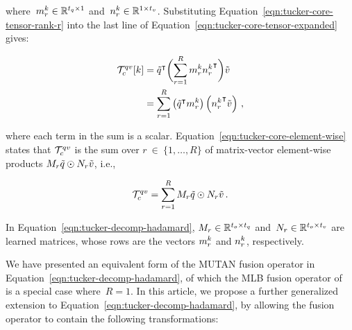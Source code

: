 \noindent where~$m_r^k \in \mathbb{R}^{t_q \times 1}$ and~$n_r^k \in \mathbb{R}^{1 \times t_v}$.
Substituting Equation~\ref{eqn:tucker-core-tensor-rank-r} into the last line of
Equation~\ref{eqn:tucker-core-tensor-expanded} gives:

\begin{align}
\begin{split}
        \mathcal{T}_c^{qv}[k] &= {\tilde{q}}^\intercal
                \biggl(\sum_{r = 1}^R m_r^k {n_r^k}^\intercal\biggr) \tilde{v}  \\
                     &= \sum_{r = 1}^R \left({\tilde{q}}^\intercal m_r^k\right)
                                \left({n_r^k}^\intercal \tilde{v}\right) \,,
\end{split}
\label{eqn:tucker-core-element-wise}
\end{align}

\noindent where each term in the sum is a scalar.
Equation~\ref{eqn:tucker-core-element-wise} states that $\mathcal{T}_c^{q{}v{}}$ is the sum
over $r~\in~\{1, \dots, R\}$ of matrix-vector element-wise products
$M_r \tilde{q} \odot N_r \tilde{v}$, i.e.,

\begin{equation}
        \mathcal{T}_c^{q{}v{}} =
                \sum_{r = 1}^R M_r \tilde{q} \odot N_r \tilde{v} \,.
\label{eqn:tucker-decomp-hadamard}
\end{equation}

\noindent In Equation~\ref{eqn:tucker-decomp-hadamard}, $M_r \in \mathbb{R}^{t_o \times t_q}$
and~$N_r \in \mathbb{R}^{t_o \times t_v}$ are learned matrices, whose rows are the
vectors $m_r^k$ and $n_r^k$, respectively.

We have presented an equivalent form of the MUTAN fusion operator in
Equation~\ref{eqn:tucker-decomp-hadamard}, of which the MLB fusion operator
of~\cite{Kim2017} is a special case where~$R = 1$. In this article, we propose a
further generalized extension to Equation~\ref{eqn:tucker-decomp-hadamard}, by
allowing the fusion operator to contain the following transformations:

